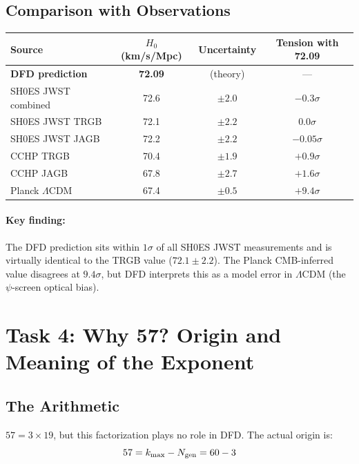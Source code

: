 \documentclass[11pt]{article}
\begin{document}
\subsection{Comparison with Observations}

\begin{center}
\begin{tabular}{lccc}
\toprule
Source & $H_0$ (km/s/Mpc) & Uncertainty & Tension with 72.09 \\
\midrule
\textbf{DFD prediction} & \textbf{72.09} & (theory) & --- \\
\midrule
SH0ES JWST combined & 72.6 & $\pm 2.0$ & $-0.3\sigma$ \\
SH0ES JWST TRGB & 72.1 & $\pm 2.2$ & $0.0\sigma$ \\
SH0ES JWST JAGB & 72.2 & $\pm 2.2$ & $-0.05\sigma$ \\
CCHP TRGB & 70.4 & $\pm 1.9$ & $+0.9\sigma$ \\
CCHP JAGB & 67.8 & $\pm 2.7$ & $+1.6\sigma$ \\
Planck $\Lambda$CDM & 67.4 & $\pm 0.5$ & $+9.4\sigma$ \\
\bottomrule
\end{tabular}
\end{center}

\paragraph{Key finding:} The DFD prediction sits within $1\sigma$ of all
SH0ES JWST measurements and is virtually identical to the TRGB value
($72.1 \pm 2.2$). The Planck CMB-inferred value disagrees at $9.4\sigma$,
but DFD interprets this as a model error in $\Lambda$CDM (the
$\psi$-screen optical bias).

\section{Task 4: Why 57? Origin and Meaning of the Exponent}
\label{sec:why57}

\subsection{The Arithmetic}

$57 = 3 \times 19$, but this factorization plays no role in DFD.
The actual origin is:
\begin{equation}
57 = k_{\max} - N_{\rm gen} = 60 - 3
\end{equation}
\end{document}
